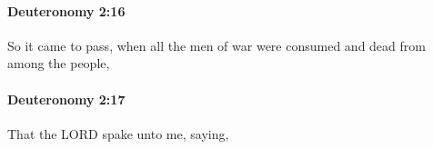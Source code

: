 		\paragraph{Deuteronomy 2:16} %
			\label{DEUTERONOMY-2-16}

			So it came to pass, when all the men of war were consumed and dead from among the people,


		\paragraph{Deuteronomy 2:17} %
			\label{DEUTERONOMY-2-17}

			That the LORD spake unto me, saying,


